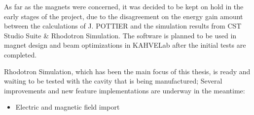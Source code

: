 \documentclass[a4paper,oneside,12pt]{report}
\numberwithin{equation}{chapter}
\begin{document}
{As far as the magnets were concerned, it was decided to be kept on hold in the early stages of the project, 
due to the disagreement on the energy gain amount between the calculations of J. POTTIER \cite{rhodo_pottier} 
and the simulation results from CST Studio Suite \& Rhodotron Simulation. 
The software is planned to be used in magnet design and beam optimizations in KAHVELab after the initial tests are completed.

Rhodotron Simulation, which has been the main focus of this thesis, is ready and waiting to be tested with the cavity that is being manufactured; 
Several improvements and new feature implementations are underway in the meantime:

\begin{itemize}
    \item Electric and magnetic field import

\end{itemize}}
\end{document}
